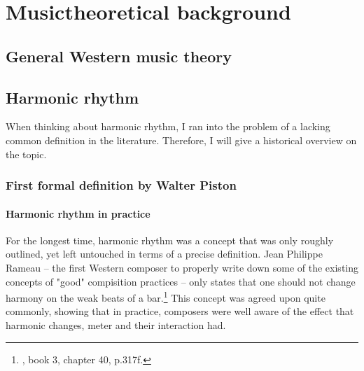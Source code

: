 \documentclass[a4paper,12pt]{report}
\begin{document}
\chapter{Musictheoretical background}
\section{General Western music theory}


\section{Harmonic rhythm}
When thinking about harmonic rhythm, I ran into the problem of a lacking common definition in the literature. Therefore, I will give a historical overview on the topic.

\subsection{First formal definition by Walter Piston}
\subsubsection{Harmonic rhythm in practice}
For the longest time, harmonic rhythm was a concept that was only roughly outlined, yet left untouched in terms of a precise definition. Jean Philippe Rameau -- the first Western composer to properly write down some of the existing concepts of "good" compisition practices -- only states that one should not change harmony on the weak beats of a bar.\footnote{\cite{rameau1722traite}, book 3, chapter 40, p.317f.} This concept was agreed upon quite commonly, showing that in practice, composers were well aware of the effect that harmonic changes, meter and their interaction had.
\end{document}
